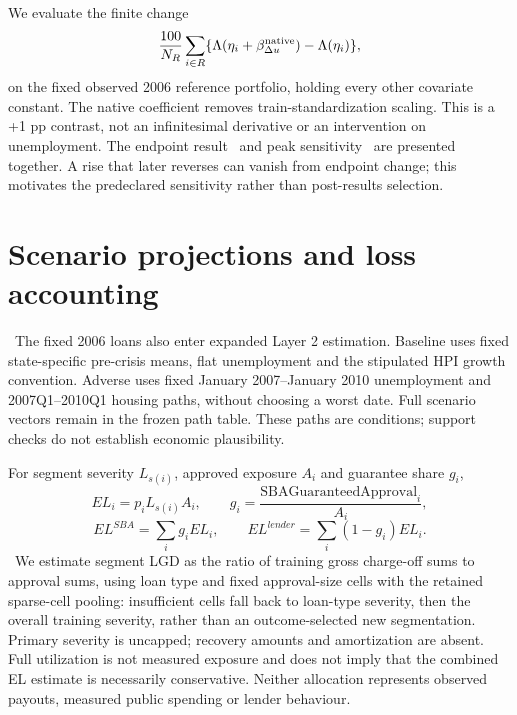 We evaluate the finite change
\[\frac{100}{N_R}\sum_{i\in R}\{\Lambda(\eta_i+\beta_{\Delta u}^{\rm native})-\Lambda(\eta_i)\},\]
on the fixed observed 2006 reference portfolio, holding every other covariate constant. The native coefficient removes train-standardization scaling. This is a +1 pp contrast, not an infinitesimal derivative or an intervention on unemployment. The endpoint result \Endpoint\ and peak sensitivity \Peak\ are presented together. A rise that later reverses can vanish from endpoint change; this motivates the predeclared sensitivity rather than post-results selection.

\section{Scenario projections and loss accounting}
\scenario\ The fixed 2006 loans also enter expanded Layer 2 estimation. Baseline uses fixed state-specific pre-crisis means, flat unemployment and the stipulated HPI growth convention. Adverse uses fixed January 2007--January 2010 unemployment and 2007Q1--2010Q1 housing paths, without choosing a worst date. Full scenario vectors remain in the frozen path table. These paths are conditions; support checks do not establish economic plausibility.

For segment severity $L_{s(i)}$, approved exposure $A_i$ and guarantee share $g_i$,
\[EL_i=p_i L_{s(i)} A_i,\qquad g_i=\frac{\text{SBAGuaranteedApproval}_i}{A_i},\]
\[EL^{SBA}=\sum_i g_i EL_i,\qquad EL^{lender}=\sum_i(1-g_i)EL_i.\]
\losslabel\ We estimate segment LGD as the ratio of training gross charge-off sums to approval sums, using loan type and fixed approval-size cells with the retained sparse-cell pooling: insufficient cells fall back to loan-type severity, then the overall training severity, rather than an outcome-selected new segmentation. Primary severity is uncapped; recovery amounts and amortization are absent. Full utilization is not measured exposure and does not imply that the combined EL estimate is necessarily conservative. Neither allocation represents observed payouts, measured public spending or lender behaviour.


